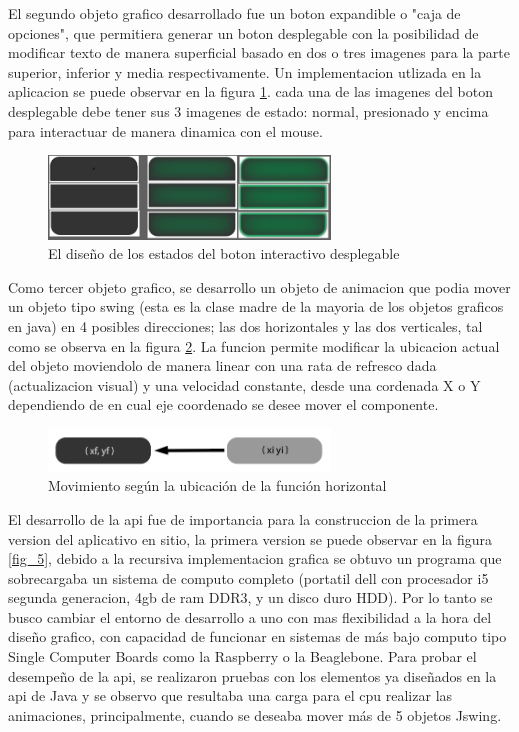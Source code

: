 El segundo objeto grafico desarrollado fue un boton expandible o "caja de opciones", que permitiera generar un boton desplegable con la posibilidad de modificar texto de manera superficial basado en dos o tres imagenes para la parte superior, inferior y media respectivamente. Un implementacion utlizada en la aplicacion se puede observar en la figura \ref{fig_3}. cada una de las imagenes del boton desplegable debe tener sus 3 imagenes de estado: normal, presionado y encima para interactuar de manera dinamica con el mouse.

\begin{figure}[htbp]
	\centerline{\includegraphics[width=7.5cm]{./figuras/boton_desplegable.png}}
	\caption{El diseño de los estados del boton interactivo desplegable}
	\label{fig_3}
\end{figure}

Como tercer objeto grafico, se desarrollo un objeto de animacion que podia mover un objeto tipo swing (esta es la clase madre de la mayoria de los objetos graficos en java) en 4 posibles direcciones; las dos horizontales y las dos verticales, tal como se observa en la figura \ref{fig_4}. La funcion permite modificar la ubicacion actual del objeto moviendolo de manera linear con una rata de refresco dada (actualizacion visual) y una velocidad constante, desde una cordenada X o Y dependiendo de en cual eje coordenado se desee mover el componente.

\begin{figure}[htbp]
	\centerline{\includegraphics[width=7.5cm]{./figuras/boton_movimiento.png}}
	\caption{Movimiento según la ubicación de la función horizontal}
	\label{fig_4}
\end{figure}

El desarrollo de la api fue de importancia para la construccion de la primera version del aplicativo en sitio, la primera version se puede observar en la figura \ref{fig_5}, debido a la recursiva implementacion grafica se obtuvo un programa que sobrecargaba un sistema de computo completo (portatil dell con procesador i5 segunda generacion, 4gb de ram DDR3, y un disco duro HDD). Por lo tanto se busco cambiar el entorno de desarrollo a uno con mas flexibilidad a la hora del diseño grafico, con capacidad de funcionar en sistemas de más bajo computo tipo Single Computer Boards como la Raspberry o la Beaglebone. Para probar el desempeño de la api, se realizaron pruebas con los elementos ya diseñados en la api de Java y se observo que resultaba una carga para el cpu realizar las animaciones, principalmente, cuando se deseaba mover más de 5 objetos Jswing.

